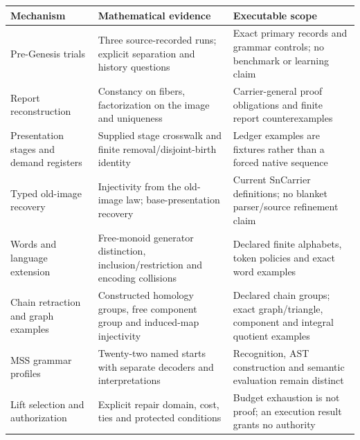\documentclass[
  11pt,
]{article}
\begin{document}
\begin{longtable}[]{@{}
  >{\raggedright\arraybackslash}p{}
  >{\raggedright\arraybackslash}p{}
  >{\raggedright\arraybackslash}p{}@{}}
\toprule\noalign{}
\begin{minipage}[b]{\linewidth}\raggedright
Mechanism
\end{minipage} & \begin{minipage}[b]{\linewidth}\raggedright
Mathematical evidence
\end{minipage} & \begin{minipage}[b]{\linewidth}\raggedright
Executable scope
\end{minipage} \\
\midrule\noalign{}
\endhead
\bottomrule\noalign{}
\endlastfoot
Pre-Genesis trials & Three source-recorded runs; explicit separation and
history questions & Exact primary records and grammar controls; no
benchmark or learning claim \\
Report reconstruction & Constancy on fibers, factorization on the image
and uniqueness & Carrier-general proof obligations and finite report
counterexamples \\
Presentation stages and demand registers & Supplied stage crosswalk and
finite removal/disjoint-birth identity & Ledger examples are fixtures
rather than a forced native sequence \\
Typed old-image recovery & Injectivity from the old-image law;
base-presentation recovery & Current SnCarrier definitions; no blanket
parser/source refinement claim \\
Words and language extension & Free-monoid generator distinction,
inclusion/restriction and encoding collisions & Declared finite
alphabets, token policies and exact word examples \\
Chain retraction and graph examples & Constructed homology groups, free
component group and induced-map injectivity & Declared chain groups;
exact graph/triangle, component and integral quotient examples \\
MSS grammar profiles & Twenty-two named starts with separate decoders
and interpretations & Recognition, AST construction and semantic
evaluation remain distinct \\
Lift selection and authorization & Explicit repair domain, cost, ties
and protected conditions & Budget exhaustion is not proof; an execution
result grants no authority \\
\end{longtable}
\end{document}
